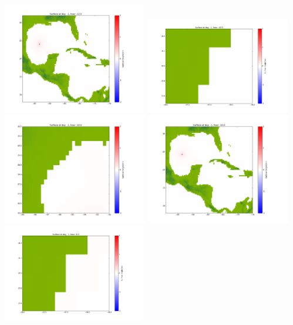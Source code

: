 \documentclass[11pt]{article}
\begin{document}
\vskip 10pt 
\includegraphics[width=0.475\textwidth]{frame0006fig1003.png}
\vskip 10pt 
\includegraphics[width=0.475\textwidth]{frame0007fig1001.png}
\includegraphics[width=0.475\textwidth]{frame0007fig1002.png}
\vskip 10pt 
\includegraphics[width=0.475\textwidth]{frame0007fig1003.png}
\vskip 10pt 
\includegraphics[width=0.475\textwidth]{frame0008fig1001.png}
\end{document}
